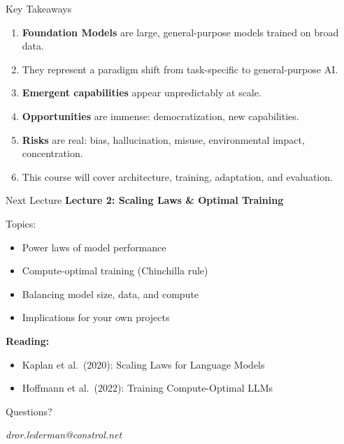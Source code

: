 \documentclass[aspectratio=169,10pt]{beamer}
\begin{document}
\begin{frame}{Key Takeaways}
  \begin{tcolorbox}[hitbox, title=Summary]
    \begin{enumerate}
      \item \textbf{Foundation Models} are large, general-purpose models trained on broad data.
      \item They represent a paradigm shift from task-specific to general-purpose AI.
      \item \textbf{Emergent capabilities} appear unpredictably at scale.
      \item \textbf{Opportunities} are immense: democratization, new capabilities.
      \item \textbf{Risks} are real: bias, hallucination, misuse, environmental impact, concentration.
      \item This course will cover architecture, training, adaptation, and evaluation.
    \end{enumerate}
  \end{tcolorbox}
\end{frame}

\begin{frame}{Next Lecture}
  \Large
  \textbf{Lecture 2: Scaling Laws \& Optimal Training}

  \vspace{0.5cm}

  Topics:
  \begin{itemize}
    \item Power laws of model performance
    \item Compute-optimal training (Chinchilla rule)
    \item Balancing model size, data, and compute
    \item Implications for your own projects
  \end{itemize}

  \vspace{0.5cm}

  \textbf{Reading:}
  \begin{itemize}
    \item Kaplan et al.\ (2020): Scaling Laws for Language Models
    \item Hoffmann et al.\ (2022): Training Compute-Optimal LLMs
  \end{itemize}
\end{frame}

\begin{frame}
  \centering
  \Huge
  Questions?

  \vspace{0.5cm}

  \normalsize
  \textit{dror.lederman@constrol.net}
\end{frame}
\end{document}
